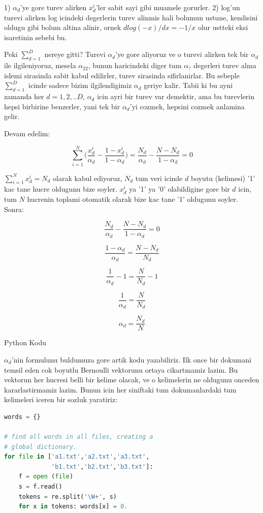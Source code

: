 \documentclass[12pt,fleqn]{article}
\begin{document}
1) $\alpha_d$'ye gore turev alirken $x_d^i$'ler sabit sayi gibi muamele
gorurler. 2) log'un turevi alirken log icindeki degerlerin turev alinmis hali
bolumun ustune, kendisini oldugu gibi bolum altina alinir, ornek 
$dlog(-x)/dx = -1/x$ olur ustteki eksi isaretinin sebebi bu. 

Peki $\sum_{d=1}^{D}$ nereye gitti? Turevi $\alpha_d$'ye gore aliyoruz ve o
turevi alirken tek bir $\alpha_d$ ile ilgileniyoruz, mesela $\alpha_{22}$, bunun
haricindeki diger tum $\alpha_?$ degerleri turev alma islemi sirasinda sabit
kabul edilirler, turev sirasinda sifirlanirlar. Bu sebeple $\sum_{d=1}^{D}$
icinde sadece bizim ilgilendigimiz $\alpha_d$ geriye kalir. Tabii ki bu ayni
zamanda her $d=1,2,..D$, $\alpha_d$ icin ayri bir turev var demektir, ama bu
turevlerin hepsi birbirine benzerler, yani tek bir $\alpha_d$'yi cozmek, hepsini
cozmek anlamina gelir.

Devam edelim:

\[ \sum_{i=1}^N \bigg( \frac{x_d^i}{\alpha_d} - \frac{1-x_d^i}{1-\alpha_d} \bigg) =
\frac{N_d}{\alpha_d} - \frac{N-N_d}{1-\alpha_d} = 0
 \]

$\sum_{i=1}^N x_d^i = N_d$ olarak kabul ediyoruz, $N_d$ tum veri icinde $d$
boyutu (kelimesi) '1' kac tane hucre oldugunu bize soyler. $x_d^i$ ya '1' ya '0'
olabildigine gore bir $d$ icin, tum $N$ hucrenin toplami otomatik olarak bize
kac tane '1' oldugunu soyler. Sonra:

\[ \frac{N_d}{\alpha_d} - \frac{N-N_d}{1-\alpha_d} = 0  \]

\[ \frac{1-\alpha_d}{\alpha_d} = \frac{N-N_d}{N_d}   \]

\[ \frac{1}{\alpha_d} - 1 = \frac{N}{N_d} - 1  \]

\[ \frac{1}{\alpha_d} = \frac{N}{N_d}  \]

\[ \alpha_d = \frac{N_d}{N}  \]

Python Kodu

$\alpha_d$'nin formulunu buldumuza gore artik kodu yazabiliriz. Ilk once bir
dokumani temsil eden cok boyutlu Bernoulli vektorunu ortaya cikartmamiz
lazim. Bu vektorun her hucresi belli bir kelime olacak, ve o kelimelerin ne
oldugunu onceden kararlastirmamiz lazim. Bunun icin her siniftaki tum
dokumanlardaki tum kelimeleri iceren bir sozluk yaratiriz:

\begin{lstlisting}[language=Python]
words = {}

# find all words in all files, creating a 
# global dictionary.
for file in ['a1.txt','a2.txt','a3.txt',
             'b1.txt','b2.txt','b3.txt']:
    f = open (file)
    s = f.read()
    tokens = re.split('\W+', s)
    for x in tokens: words[x] = 0.
\end{lstlisting}
\end{document}
